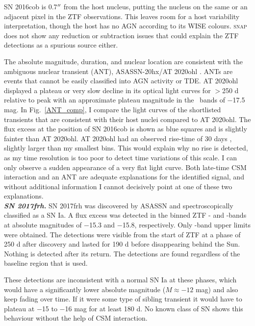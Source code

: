 \documentclass[a4paper,oneside,12pt, class=Latex/Classes/PhDthesisPSnPDF, crop=false]{standalone}
\begin{document}
SN 2016cob is 0.7$^{\prime\prime}$ from the host nucleus, putting the nucleus on the same or an adjacent pixel in the ZTF observations. This leaves room for a host variability interpretation, though the host has no AGN according to its WISE colours. \textsc{snap} does not show any reduction or subtraction issues that could explain the ZTF detections as a spurious source either. 

The absolute magnitude, duration, and nuclear location are consistent with the ambiguous nuclear transient (ANT), ASASSN-20hx/AT 2020ohl \citep{Hinkle_Extreme_nuclear_transients/ANTs}. ANTs are events that cannot be easily classified into AGN activity or TDE. AT 2020ohl displayed a plateau or very slow decline in its optical light curves for $>$250 d relative to peak with an approximate plateau magnitude in the \ztfg\ztfr\ztfi\ bands of $-$17.5 mag. In Fig.~\ref{ANT_comp}, I compare the light curves of the shortlisted transients that are consistent with their host nuclei compared to AT 2020ohl. The flux excess at the position of SN 2016cob is shown as blue squares and is slightly fainter than AT 2020ohl. AT 2020ohl had an observed rise-time of 30 days \citep{Hinkle_Extreme_nuclear_transients/ANTs}, slightly larger than my smallest bins. This would explain why no rise is detected, as my time resolution is too poor to detect time variations of this scale. I can only observe a sudden appearance of a very flat light curve. Both late-time CSM interaction and an ANT are adequate explanations for the identified signal, and without additional information I cannot decisively point at one of these two explanations.\\


\textit{\textbf{SN 2017frh.}}
SN 2017frh was discovered by ASASSN and spectroscopically classified as a SN Ia. A flux excess was detected in the binned ZTF \ztfg- and \ztfr-bands at absolute magnitudes of $-$15.3 and $-$15.8, respectively. Only \ztfi-band upper limits were obtained. The detections were visible from the start of ZTF at a phase of 250 d after discovery and lasted for 190 d before disappearing behind the Sun. Nothing is detected after its return. The detections are found regardless of the baseline region that is used.

These detections are inconsistent with a normal SN Ia at these phases, which would have a significantly lower absolute magnitude ($M\approx-12$ mag) and also keep fading over time. If it were some type of sibling transient it would have to plateau at $-$15 to $-$16 mag for at least 180 d. No known class of SN shows this behaviour without the help of CSM interaction.
\end{document}
